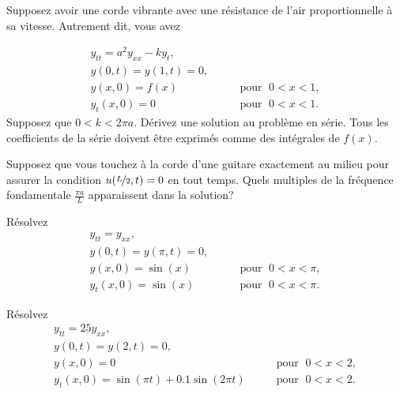 \begin{exercise}[défi]
Supposez avoir une corde vibrante avec une résistance de l'air proportionnelle à sa vitesse.  Autrement dit,  vous avez

\begin{equation*}
\begin{array}{ll}
y_{tt} = a^2 y_{xx} - k y_t , &  \\
y(0,t) = y(1,t) = 0 , &  \\
y(x,0) = f(x) & \qquad \text{pour } \; 0 < x < 1 , \\
y_t(x,0) = 0 & \qquad \text{pour } \; 0 < x < 1 .
\end{array}
\end{equation*}
Supposez que $0 < k < 2 \pi a$.
Dérivez une solution au problème en série. Tous les coefficients de la série
doivent être exprimés comme des intégrales de $f(x)$.
\end{exercise}

\begin{exercise}
Supposez que vous touchez à la corde d'une guitare exactement au milieu pour
assurer la condition $u(\nicefrac{L}{2},t) = 0$ en tout temps.
Quels multiples de la fréquence fondamentale $\frac{\pi a}{L}$
apparaissent dans la solution?
\end{exercise}

\setcounter{exercise}{100}

\begin{exercise}
Résolvez
\begin{equation*}
\begin{array}{ll}
y_{tt} = y_{xx} , &  \\
y(0,t) = y(\pi,t) = 0 , &  \\
y(x,0) = \sin(x) & \qquad \text{pour } \; 0 < x < \pi , \\
y_t(x,0) = \sin(x) & \qquad \text{pour } \; 0 < x < \pi .
\end{array}
\end{equation*}
\end{exercise}

\begin{exercise}
Résolvez
\begin{equation*}
\begin{array}{ll}
y_{tt} = 25 y_{xx} , &  \\
y(0,t) = y(2,t) = 0 , &  \\
y(x,0) = 0 & \qquad \text{pour } \; 0 < x < 2 , \\
y_t(x,0) = \sin(\pi t) + 0.1 \sin(2\pi t) & \qquad \text{pour } \; 0 < x < 2 .
\end{array}
\end{equation*}
\end{exercise}

